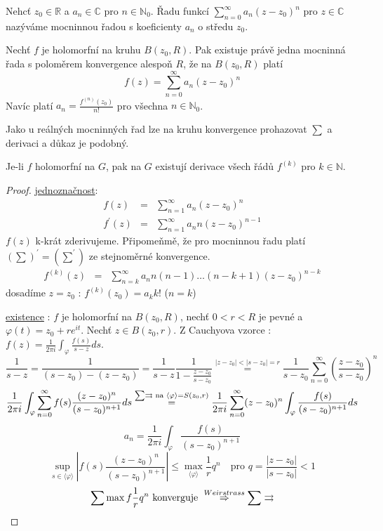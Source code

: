 \begin{definice}
Nehcť $z_0 \in \mathbb{R}$ a $a_n \in \mathbb{C}$ pro $n \in \mathbb{N}_0$. Řadu funkcí $\sum_{n=0}^{\infty} a_n (z-z_0)^n$ pro $z \in \mathbb{C}$ nazýváme mocninnou řadou s koeficienty $a_n$ o středu $z_0$.
\end{definice}

\begin{vetat}
\label{o rozvoji do Taylorovy řady}
Nechť $f$ je holomorfní na kruhu $B(z_0, R)$. Pak existuje právě jedna mocninná řada s poloměrem konvergence alespoň $R$, že na $B(z_0, R)$ platí
$$f(z) = \sum_{n=0}^\infty a_n (z-z_0)^n$$
Navíc platí $a_n = \frac{f^{(n)}(z_0)}{n!}$ pro všechna $n \in \mathbb{N}_0$.
\end{vetat}

Jako u reálných mocninných řad lze na kruhu konvergence prohazovat $\sum$ a derivaci a důkaz je podobný.

\begin{dusledek}
Je-li $f$ holomorfní na $G$, pak na $G$ existují derivace všech řádů $f^{(k)}$ pro $k \in \mathbb{N}$.
\end{dusledek}

\begin{proof}
\underline{jednoznačnost}: 
\begin{eqnarray*}
f(z) & = & \sum_{n=1}^\infty a_n (z-z_0)^n \\
f^\prime(z) & = & \sum_{n=1}^\infty a_n n (z-z_0)^{n-1}
\end{eqnarray*}
$f(z)$ k-krát zderivujeme. Připomeňmě, že pro mocninnou řadu platí $(\sum)^\prime = (\sum ^\prime)$ ze stejnoměrné konvergence.
\begin{eqnarray*}
f^{(k)}(z) & = & \sum_{n=k}^\infty a_n n (n-1) \ldots (n-k+1)(z-z_0)^{n-k}
\end{eqnarray*}
dosadíme $z=z_0$ : $f^{(k)}(z_0) = a_k k!$ ($n=k$)

\underline{existence} :
$f$ je holomorfní na $B(z_0, R)$, nechť $0 < r < R$ je pevné a $\varphi (t) = z_0 + re^{it}$. Nechť $z \in B(z_0, r)$. Z Cauchyova vzorce : $f(z) = \frac{1}{2 \pi i} \int_\varphi \frac{f(s)}{s-z} ds$.
$$\frac{1}{s-z} = \frac{1}{(s-z_0)-(z-z_0)} = \frac{1}{s-z} \frac{1}{1 - \frac{z-z_0}{s-z_0}} \overset{|z-z_0|<|s-z_0|=r}{=} \frac{1}{s-z_0} \sum_{n=0}^\infty \left( \frac{z-z_0}{s-z_0} \right)^n$$
$$\frac{1}{2 \pi i} \int_\varphi \sum_{n=0}^\infty f(s) \frac{(z-z_0)^n}{(s-z_0)^{n+1}} ds \overset{\sum \rightrightarrows \textrm{ na } \langle \varphi \rangle = S(z_0, r)}{=} \frac{1}{2 \pi i} \sum_{n=0}^\infty (z-z_0)^n \int_\varphi \frac{f(s)}{(s-z_0)^{n+1}} ds$$
$$a_n = \frac{1}{2 \pi i} \int_\varphi \frac{f(s)}{(s-z_0)^{n+1}}$$
$$\sup_{s \in \langle \varphi \rangle} \left| f(s) \frac{(z-z_0)^n}{(s-z_0)^{n+1}} \right| \leq \max_{\langle \varphi \rangle} \frac{1}{r} q^n \quad \textrm{pro } q = \frac{|z-z_0|}{|s-z_0|} < 1$$
$$\sum \max f \frac{1}{r} q^n \textrm{ konverguje } \overset{Weirstrass}{\Rightarrow} \sum \rightrightarrows$$
\end{proof}


